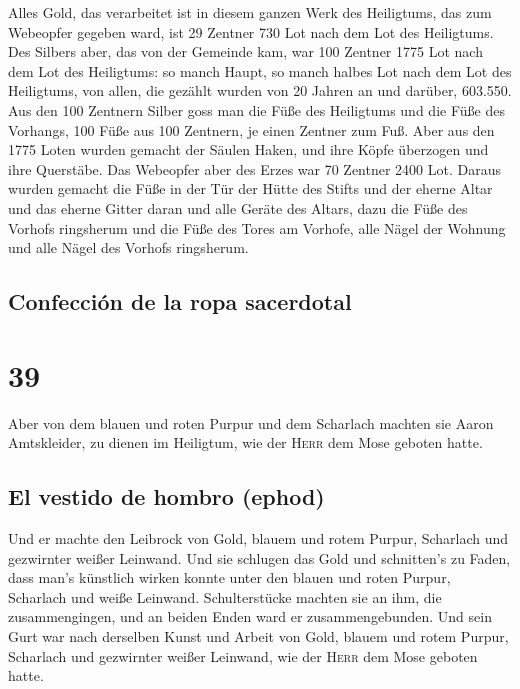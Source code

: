  Alles Gold, das verarbeitet ist in diesem ganzen Werk
des Heiligtums, das zum Webeopfer gegeben ward, ist 29 Zentner 730 Lot
nach dem Lot des Heiligtums.  Des Silbers aber, das von
der Gemeinde kam, war 100 Zentner 1775 Lot nach dem Lot des Heiligtums:
 so manch Haupt, so manch halbes Lot nach dem Lot des
Heiligtums, von allen, die gezählt wurden von 20 Jahren an und darüber,
603.550.  Aus den 100 Zentnern Silber goss man die Füße
des Heiligtums und die Füße des Vorhangs, 100 Füße aus 100 Zentnern, je
einen Zentner zum Fuß.  Aber aus den 1775 Loten wurden
gemacht der Säulen Haken, und ihre Köpfe überzogen und ihre Querstäbe.
 Das Webeopfer aber des Erzes war 70 Zentner 2400 Lot.
 Daraus wurden gemacht die Füße in der Tür der Hütte des
Stifts und der eherne Altar und das eherne Gitter daran und alle Geräte
des Altars,  dazu die Füße des Vorhofs ringsherum und die
Füße des Tores am Vorhofe, alle Nägel der Wohnung und alle Nägel des
Vorhofs ringsherum.

\hypertarget{confecciuxf3n-de-la-ropa-sacerdotal}{%
\subsection{Confección de la ropa
sacerdotal}\label{confecciuxf3n-de-la-ropa-sacerdotal}}

\hypertarget{section-38}{%
\section{39}\label{section-38}}

 Aber von dem blauen und roten Purpur und dem Scharlach
machten sie Aaron Amtskleider, zu dienen im Heiligtum, wie der
\textsc{Herr} dem Mose geboten hatte.

\hypertarget{el-vestido-de-hombro-ephod-1}{%
\subsection{El vestido de hombro
(ephod)}\label{el-vestido-de-hombro-ephod-1}}

 Und er machte den Leibrock von Gold, blauem und rotem
Purpur, Scharlach und gezwirnter weißer Leinwand.  Und sie
schlugen das Gold und schnitten's zu Faden, dass man's künstlich wirken
konnte unter den blauen und roten Purpur, Scharlach und weiße Leinwand.
 Schulterstücke machten sie an ihm, die zusammengingen,
und an beiden Enden ward er zusammengebunden.  Und sein
Gurt war nach derselben Kunst und Arbeit von Gold, blauem und rotem
Purpur, Scharlach und gezwirnter weißer Leinwand, wie der \textsc{Herr}
dem Mose geboten hatte.

